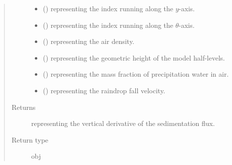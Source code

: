 \documentclass[letterpaper,10pt,english]{sphinxmanual}
\begin{document}
\begin{fulllineitems}
\begin{fulllineitems}
\begin{quote}
\begin{description}
\begin{itemize}
\item {} 
 () \textendash{}  representing the index running along the \(y\)-axis.

\item {} 
 () \textendash{}  representing the index running along the \(\theta\)-axis.

\item {} 
 () \textendash{}  representing the air density.

\item {} 
 () \textendash{}  representing the geometric height of the model half-levels.

\item {} 
 () \textendash{}  representing the mass fraction of precipitation water in air.

\item {} 
 () \textendash{}  representing the raindrop fall velocity.

\end{itemize}

\item[{Returns}] \leavevmode
{} representing the vertical derivative of the sedimentation flux.

\item[{Return type}] \leavevmode
obj

\end{description}\end{quote}

\end{fulllineitems}


\end{fulllineitems}

\end{document}
